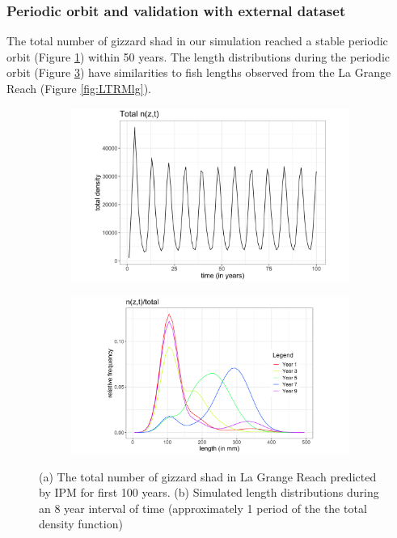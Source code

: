 \documentclass[preprint,review,12pt,authoryear]{elsarticle}
\begin{document}
\subsubsection{Periodic orbit and validation with external dataset}
The total number of gizzard shad in our simulation reached a stable periodic orbit (Figure \ref{fig:ntotal}) within 50 years. 
The length distributions during the periodic orbit (Figure \ref{fig:period}) have similarities to fish lengths observed from the La Grange Reach (Figure \ref{fig:LTRMlg}). 
\begin{figure}
\centering
\begin{subfigure}[b]{.43\textwidth}
  \includegraphics[width=\textwidth]{figures/ntotal.png}
   \caption{}
  \label{fig:ntotal}
\end{subfigure}
\begin{subfigure}[b]{.43\textwidth}
   \includegraphics[width=\textwidth]{figures/period.png}
     \caption{}
\label{fig:period}
\end{subfigure}
\caption{(a) The total number of gizzard shad in La Grange Reach predicted by IPM for first 100 years. (b) Simulated length distributions during an 8 year interval of time (approximately 1 period of the the total density function) }
\end{figure}    
\end{document}
